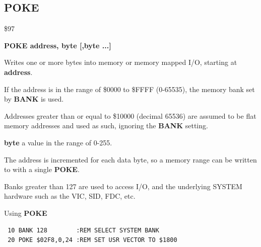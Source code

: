 \subsection{POKE}
\begin{description}[leftmargin=2cm,style=nextline]
\item [Token:] \$97
\item [Format:] {\bf POKE address, byte [,byte ...] }
\item [Usage:]  Writes one or more bytes into memory
                or memory mapped I/O, starting at
                {\bf address}.

                If the address is in the range of \$0000 to \$FFFF (0-65535), the
                memory bank set by {\bf BANK} is used.

                Addresses greater than or equal to \$10000 (decimal 65536) are assumed to be flat memory
                addresses and used as such, ignoring the {\bf BANK} setting.

                {\bf byte} a value in the range of 0-255.

\item [Remarks:] The address is incremented for each data byte,
                 so a memory range can be written to with a single {\bf POKE}.

                 Banks greater than 127 are used to access I/O, and the underlying SYSTEM hardware such as the
                 VIC, SID, FDC, etc.


\item [Example:] Using {\bf POKE}

\begin{tcolorbox}[colback=black,coltext=white]
\verbatimfont{\codefont}
\begin{verbatim}
 10 BANK 128        :REM SELECT SYSTEM BANK
 20 POKE $02F8,0,24 :REM SET USR VECTOR TO $1800
\end{verbatim}
\end{tcolorbox}
\end{description}


\newpage
